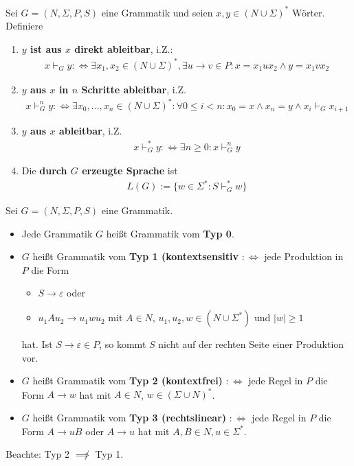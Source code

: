\begin{definition}\label{def6.4}
	Sei $G=(N,\Sigma,P,S)$ eine Grammatik und seien $x,y\in(N\cup\Sigma)^\ast$ Wörter. Definiere
	\begin{enumerate}[label=\arabic*)]
		\item \textbf{$y$ ist aus $x$ direkt ableitbar}, i.Z.:
		\begin{align*}
			x\vdash_G y:\Longleftrightarrow\exists x_1,x_2\in (N\cup\Sigma)^\ast,\exists u\to v\in P: x=x_1 ux_2\wedge y=x_1 vx_2
		\end{align*}
		\item \textbf{$y$ aus $x$ in $n$ Schritte ableitbar}, i.Z.
		\begin{align*}
			x\vdash_G^n y:\Longleftrightarrow\exists x_0,\ldots,x_n\in (N\cup\Sigma)^\ast:\forall 0\leq i<n:x_0=x\wedge x_n=y\wedge x_i\vdash_G x_{i+1}
		\end{align*}
		\item \textbf{$y$ aus $x$ ableitbar}, i.Z.
		\begin{align*}
			x\vdash_G^\ast y:\Longleftrightarrow\exists n\geq 0:x\vdash_G^n y
		\end{align*}
		\item Die \textbf{durch $G$ erzeugte Sprache} ist
		\begin{align*}
			L(G):=\big\lbrace w\in\Sigma^\ast:S\vdash_G^\ast w\big\rbrace
		\end{align*}
	\end{enumerate}
\end{definition}

\begin{definition}\label{def6.6ChomskyHierarchie}\enter
	Sei $G=(N,\Sigma,P,S)$ eine Grammatik.
	\begin{itemize}
		\item Jede Grammatik $G$ heißt Grammatik vom \textbf{Typ 0}.
		\item $G$ heißt Grammatik vom \textbf{Typ 1 (kontextsensitiv} $:\Longleftrightarrow$ jede Produktion in $P$ die Form
		\begin{itemize}
			\item $S\to\varepsilon$ oder
			\item $u_1 Au_2\to u_1 wu_2$ mit $A\in N$, $u_1,u_2,w\in(N\cup\Sigma^\ast)$ und $|w|\geq1$
		\end{itemize}
		hat. Ist $S\to\varepsilon\in P$, so kommt $S$ nicht auf der rechten Seite einer Produktion vor.
		\item $G$ heißt Grammatik vom \textbf{Typ 2 (kontextfrei)} $:\Longleftrightarrow$ jede Regel in $P$ die Form $A\to w$ hat mit $A\in N$, $w\in(\Sigma\cup N)^\ast$.
		\item $G$ heißt Grammatik vom \textbf{Typ 3 (rechtslinear)} $:\Longleftrightarrow$ jede Regel in $P$ die Form $A\to uB$ oder $A\to u$ hat mit $A,B\in N,u\in\Sigma^\ast$.
	\end{itemize}
	Beachte: Typ 2 $\not\implies$ Typ 1.
\end{definition}

